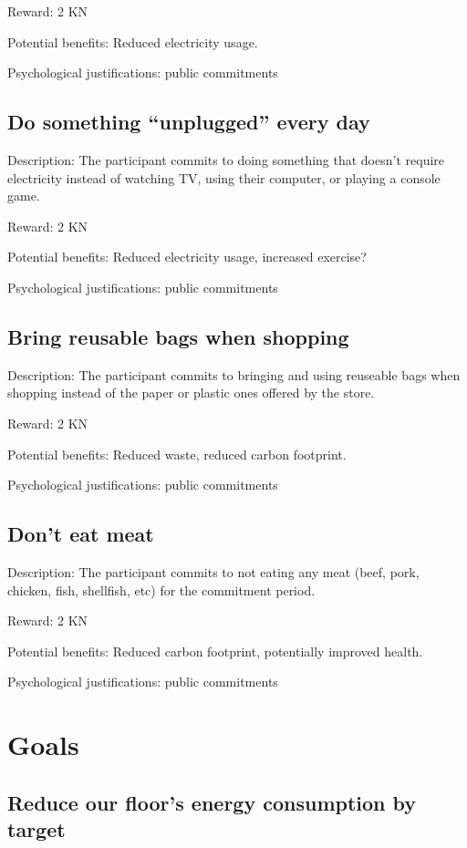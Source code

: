 Reward: 2 KN

Potential benefits: Reduced electricity usage.

Psychological justifications: public commitments

\subsection[Do something ``unplugged'' every day]{Do something ``unplugged'' every day}

Description: The participant commits to doing something that doesn't require electricity instead of watching TV, using their computer, or playing a console game.

Reward: 2 KN

Potential benefits: Reduced electricity usage, increased exercise?

Psychological justifications: public commitments

\subsection{Bring reusable bags when shopping}

Description: The participant commits to bringing and using reuseable bags when shopping instead of the paper or plastic ones offered by the store.

Reward: 2 KN

Potential benefits: Reduced waste, reduced carbon footprint.

Psychological justifications: public commitments

\subsection{Don't eat meat}

Description: The participant commits to not eating any meat (beef, pork, chicken, fish, shellfish, etc) for the commitment period.

Reward: 2 KN

Potential benefits: Reduced carbon footprint, potentially improved health.

Psychological justifications: public commitments


\section{Goals}

\subsection{Reduce our floor's energy consumption by {target} }

